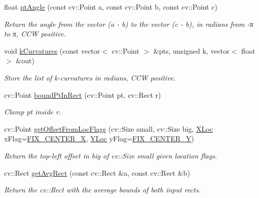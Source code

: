 \begin{DoxyCompactItemize}
float \hyperlink{namespacecvutils_1_1geom_a10c135020f2ced905d4623ca2e2c4c3b}{pt\-Angle} (const cv\-::\-Point a, const cv\-::\-Point b, const cv\-::\-Point c)
\begin{DoxyCompactList}\small\item\em Return the angle from the vector {\ttfamily (a -\/ b)} to the vector {\ttfamily (c -\/ b)}, in radians from -\/π to π, C\-C\-W positive. \end{DoxyCompactList}\item 
void \hyperlink{namespacecvutils_1_1geom_a1b829e402bd979136775e9761ff659aa}{k\-Curvatures} (const vector$<$ cv\-::\-Point $>$ \&pts, unsigned k, vector$<$ float $>$ \&out)
\begin{DoxyCompactList}\small\item\em Store the list of k-\/curvatures in radians, C\-C\-W positive. \end{DoxyCompactList}\item 
cv\-::\-Point \hyperlink{namespacecvutils_1_1geom_adadfb4fb4b44aeb7dbaf595c3abc6b28}{bound\-Pt\-In\-Rect} (cv\-::\-Point pt, cv\-::\-Rect r)
\begin{DoxyCompactList}\small\item\em Clamp {\ttfamily pt} inside {\ttfamily r}. \end{DoxyCompactList}\item 
cv\-::\-Point \hyperlink{namespacecvutils_1_1geom_a1da30c1609f24123ac40bc9aaa6672d3}{get\-Offset\-From\-Loc\-Flags} (cv\-::\-Size small, cv\-::\-Size big, \hyperlink{namespacecvutils_a955c1d8733f727414da8a357b938ced7}{X\-Loc} x\-Flag=\hyperlink{namespacecvutils_a955c1d8733f727414da8a357b938ced7a6a9a0a917be940c0641d145580dcf0f7}{F\-I\-X\-\_\-\-C\-E\-N\-T\-E\-R\-\_\-\-X}, \hyperlink{namespacecvutils_a0a32f5be1c20397001a2cdc59bacec81}{Y\-Loc} y\-Flag=\hyperlink{namespacecvutils_a0a32f5be1c20397001a2cdc59bacec81ad6382055c3ad3cb882f8f123e3b64f38}{F\-I\-X\-\_\-\-C\-E\-N\-T\-E\-R\-\_\-\-Y})
\begin{DoxyCompactList}\small\item\em Return the top-\/left offset in {\ttfamily big} of cv\-::\-Size {\ttfamily small} given location flags. \end{DoxyCompactList}\item 
cv\-::\-Rect \hyperlink{namespacecvutils_1_1geom_a37b965db77db29c0e9f62c38206a550e}{get\-Avg\-Rect} (const cv\-::\-Rect \&a, const cv\-::\-Rect \&b)
\begin{DoxyCompactList}\small\item\em Return the cv\-::\-Rect with the average bounds of both input rects. \end{DoxyCompactList}\item 

\end{DoxyCompactItemize}

